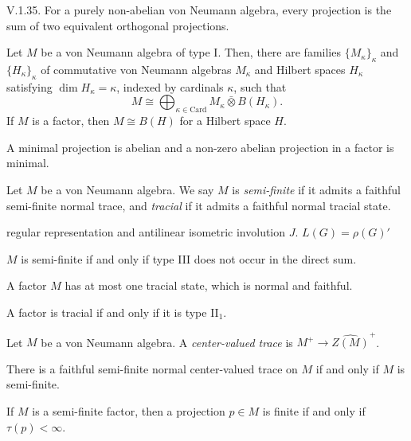 \documentclass{../../large}
\begin{document}
V.1.35. For a purely non-abelian von Neumann algebra, every projection is the sum of two equivalent orthogonal projections.



\begin{prb}[Type I]
Let $M$ be a von Neumann algebra of type I.
Then, there are families $\{M_\kappa\}_\kappa$ and $\{H_\kappa\}_\kappa$ of commutative von Neumann algebras $M_\kappa$ and Hilbert spaces $H_\kappa$ satisfying $\dim H_\kappa=\kappa$, indexed by cardinals $\kappa$, such that
\[M\cong\bigoplus_{\kappa\in\mathrm{Card}}M_\kappa\bar\otimes B(H_\kappa).\]
If $M$ is a factor, then $M\cong B(H)$ for a Hilbert space $H$.
\begin{parts}
\item A minimal projection is abelian and a non-zero abelian projection in a factor is minimal.
\end{parts}
\end{prb}














\begin{prb}
Let $M$ be a von Neumann algebra.
We say $M$ is \emph{semi-finite} if it admits a faithful semi-finite normal trace, and \emph{tracial} if it admits a faithful normal tracial state.
\begin{parts}
\item regular representation and antilinear isometric involution $J$. $L(G)=\rho(G)'$
\item $M$ is semi-finite if and only if type III does not occur in the direct sum.

\item A factor $M$ has at most one tracial state, which is normal and faithful.
\item A factor is tracial if and only if it is type II$_1$.
\end{parts}
\end{prb}


\begin{prb}
Let $M$ be a von Neumann algebra.
A \emph{center-valued trace} is $M^+\to\hat{Z(M)}^+$.
\begin{parts}
\item There is a faithful semi-finite normal center-valued trace on $M$ if and only if $M$ is semi-finite.
\item If $M$ is a semi-finite factor, then a projection $p\in M$ is finite if and only if $\tau(p)<\infty$.
\end{parts}
\end{prb}
\end{document}
